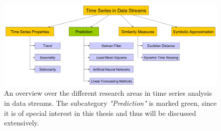 \begin{figure}[h]
	\centering
  	\includegraphics[width=\textwidth]{timeSeriesInDataStreamsOverview}
	\caption{An overview over the different research areas in time series analysis in data streams. The subcategory \textit{"Prediction"} is marked green, since it is of special interest in this thesis and thus will be discussed extensively.}
	\label{fig_timeSeriesInDataStreamsOverview}
\end{figure}

